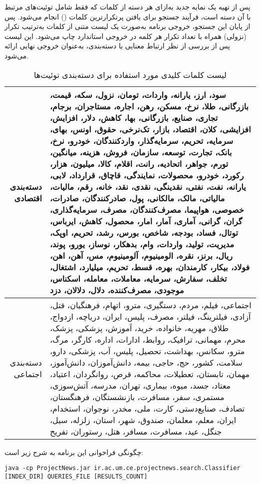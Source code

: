 \documentclass[a4paper, 12pt]{article}
\begin{document}
پس از تهیه یک نمایه جدید به‌ازای هر دسته از کلمات که فقط شامل توئیت‌های مرتبط با آن دسته است، فرآیند جستجو برای یافتن پرتکرارترین کلمات () انجام می‌شود. پس از پایان این جستجو، خروجی برنامه به‌صورت یک لیست متنی از کلمات به‌ترتیب تکرار (نزولی) همراه با تعداد تکرار هر کلمه در خروجی استاندارد چاپ می‌شود. این لیست پس از بررسی از نظر ارتباط معنایی با دسته‌بندی، به‌عنوان خروجی نهایی ارائه می‌شود.
\begin{table}
    \caption{لیست کلمات کلیدی مورد استفاده برای دسته‌بندی توئیت‌ها}
    \label{table:keywords}
    \begin{tabularx}{\textwidth}{|r|X|}
    \hline
      دسته‌بندی اقتصادی & 
      سود، ارز، یارانه‌، واردات، تومان، نزول، سکه، قیمت، بازرگانی، طلا، نرخ، مسکن، رهن، اجاره، مستاجران، برجام، تجاری، صنایع، بازرگانی، بها، کاهش، دلار، افزایش، افزایشی، کلان، اقتصاد، بازار، تک‌نرخی‌، حقوق، اونس، بهای، سرمایه، تحریم، سرمایه‌گذار، واردکنندگان، خودرو، نرخ، بانک، تجارت، توسعه، سازمان، فروش، هزینه، میانگین، تورم، جواهر، اتحادیه، رانت، اقلام، کالا، میلیون، هزار، رکورد، خودرو، محصولات، نمایندگی، قاچاق، قرارداد، لابی، یارانه، نفت، نفتی، نقدینگی، نقدی، نقد، خانه‌، رقم، مالیات، مالیاتی، مالک، مالکانی، پول، صادرکنندگان، صادرات، خصوصی، هواپیما، مصرف‌کنندگان، مصرف، سرمایه‌گذاری، گران، گرانی، آماری، آمار، امار، محصول، کاهش، ایرباس، توتال، فساد، بودجه، شاخص، بورس، رشد، تحریم، اوپک، مدیریت، تولید، واردات، وام، بدهکار، نوساز، یورو، پوند، ریال، برنز، نقره، الومینیوم، آلومینیوم، مس، آهن، اهن، فولاد، بیکار، کارمندان، بهره، قسط، تحریم، میلیارد، اشتغال، تخلف، سفارش، سرمایه، معاملات، معامله، اسکناس، موجودی، مصرف‌کننده، دلال، دلالان، دزد
      
       \\
    \hline
    دسته‌بندی اجتماعی &
    اجتماعی، فیلم، مردم، دستگیری، مترو، اتهام، فرهنگیان، ‌قتل، آزادی، فیلترینگ، فیلتر، مصرف، پلیس، ایران، دریاچه، ازدواج، طلاق، مهریه، خانواده، خرید، آموزش، پزشکی، پزشک، محرم، مهمانی، ترافیک، روابط، ادارات، اداره، کارگر، مرگ، مترو، سکانس، بهداشت، تحصیل، پلیس، آب، پزشکی، دارو، سلامت، کشور، حج، حاجی، بیمه، دانش‌آموزان، دانش‌آموز، مهمان، تابستان، تعطیلات، محاکمه، قرص، روانگردان، اعتیاد، معتاد، جسد، میوه، بیماری، تهران، مدرسه، آتش‌سوزی، مستمری، سفر، مسافرت، بازنشستگان، فرهنگستان، تصادف، صنایع‌دستی، کارت، ملی، مخدر، نوجوان، استخدام، ایران، معلم، معلمان، صندوق، شهر، استان، زلزله، سیل، جنگل‌، عید، مسافرت، مسافر، هتل، رستوران، تفریح
    \\
    \hline
    \end{tabularx}
    \end{table}

 چگونگی فراخوانی این برنامه به شرح زیر است:
\begin{latin}
    \begin{lstlisting}
java -cp ProjectNews.jar ir.ac.um.ce.projectnews.search.Classifier [INDEX_DIR] QUERIES_FILE [RESULTS_COUNT]
    \end{lstlisting}
\end{latin}
\end{document}
